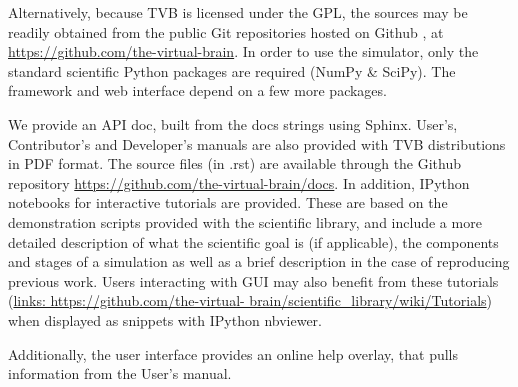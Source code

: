 Alternatively, because TVB is licensed under the GPL, the sources may be
readily obtained from the public Git repositories hosted on Github
\cite{dabbish2012social}, at 
\url{https://github.com/the-virtual-brain}. In order to use the simulator, 
only the standard scientific Python packages are required (NumPy \& SciPy).
The framework and web interface depend on a few more packages. 

We provide an API doc, built from the docs strings using Sphinx.
User's, Contributor's and Developer's manuals are also provided with TVB
distributions in PDF format. The source files (in .rst) are available
through the Github repository \url{https://github.com/the-virtual-brain/docs}.  
In addition, IPython notebooks\cite{PerezGranger_2007}
for interactive tutorials are provided. These are based on the
demonstration scripts provided with the scientific library, and
include a more detailed description of what the scientific goal is (if
applicable), the components and stages of a simulation as well as a
brief description in the case of reproducing previous work. Users
interacting with \TVB GUI may also benefit from these tutorials
(\url{links: https://github.com/the-virtual-
brain/scientific_library/wiki/Tutorials}) when displayed as snippets
with IPython nbviewer. 

Additionally, the user interface provides an online help overlay, that pulls
information from the User's manual.


